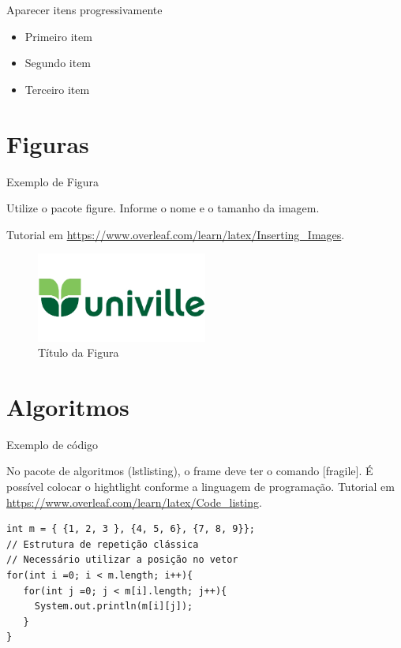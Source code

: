 \documentclass{beamer}
\begin{document}
\begin{frame}{Aparecer itens progressivamente}

\begin{itemize}
  \item<1-> Primeiro item
  \item<2-> Segundo item
  \item<3-> Terceiro item
\end{itemize}

\end{frame}

\section{Figuras}
\begin{frame}[fragile]{Exemplo de Figura}

Utilize o pacote figure. Informe o nome e o tamanho da imagem.

Tutorial em \url{https://www.overleaf.com/learn/latex/Inserting_Images}.

\begin{figure}[h]
\centering
\includegraphics[width=0.5\textwidth]{univille_logo.png}
\caption{Título da Figura}
\end{figure}

\end{frame}

\section{Algoritmos}
\begin{frame}[fragile]{Exemplo de código}

No pacote de algoritmos (lstlisting), o frame deve ter o comando [fragile].
É possível colocar o hightlight conforme a linguagem de programação.
Tutorial em \url{https://www.overleaf.com/learn/latex/Code_listing}.

\begin{lstlisting}[caption=Percorrer por todas as posições da matriz]
int m = { {1, 2, 3 }, {4, 5, 6}, {7, 8, 9}};
// Estrutura de repetição clássica
// Necessário utilizar a posição no vetor
for(int i =0; i < m.length; i++){
   for(int j =0; j < m[i].length; j++){
     System.out.println(m[i][j]);
   }
}
\end{lstlisting}

\end{frame}
\end{document}
